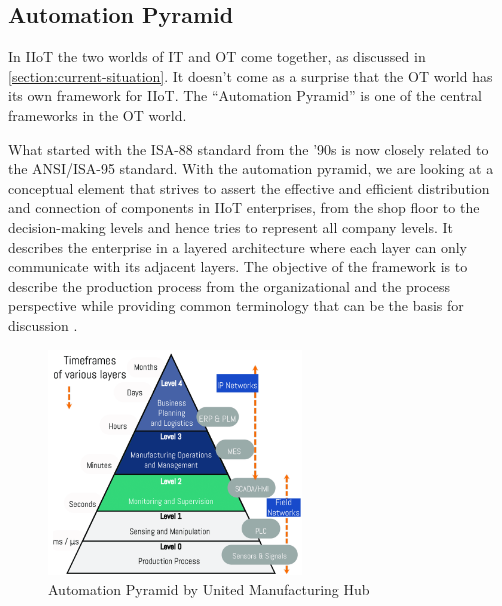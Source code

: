 \subsection{Automation Pyramid}
\label{subsection:automation-pyramid}
    In IIoT the two worlds of IT and OT come together, as discussed in \autoref{section:current-situation}. It doesn't come as a surprise that the OT world has its own framework for IIoT. The ``Automation Pyramid'' is one of the central frameworks in the OT world. 

    What started with the ISA-88 standard from the '90s is now closely related to the ANSI/ISA-95 standard. With the automation pyramid, we are looking at a conceptual element that strives to assert the effective and efficient distribution and connection of components in IIoT enterprises, from the shop floor to the decision-making levels and hence tries to represent all company levels. It describes the enterprise in a layered architecture where each layer can only communicate with its adjacent layers. The objective of the framework is to describe the production process from the organizational and the process perspective while providing common terminology that can be the basis for discussion \cite{umh_automation_pyramid, martinez_automation_2021}.

    \begin{figure}[htbp]
        \centering
        \includegraphics[width=0.6\textwidth]{img/automation-pyramid.png}
        \caption{Automation Pyramid by United Manufacturing Hub \cite{umh_automation_pyramid}}
        \label{figure:automation-pyramid}
    \end{figure}

